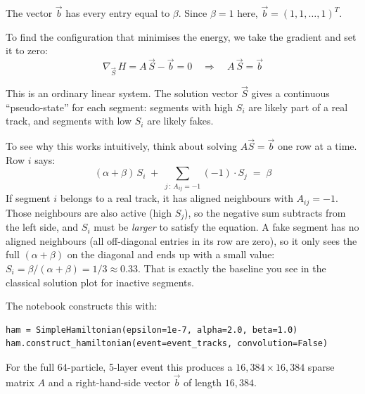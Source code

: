 \documentclass[11pt, a4paper]{article}
\begin{document}
The vector $\vec{b}$ has every entry equal to $\beta$. Since $\beta = 1$
here, $\vec{b} = (1, 1, \ldots, 1)^T$.

To find the configuration that minimises the energy, we take the gradient
and set it to zero:
\begin{equation}
    \nabla_{\vec{S}}\, H = A\,\vec{S} - \vec{b} = 0
    \quad\Longrightarrow\quad
    A\,\vec{S} = \vec{b}
\end{equation}

This is an ordinary linear system. The solution vector $\vec{S}$ gives a
continuous ``pseudo-state'' for each segment: segments with high $S_i$ are
likely part of a real track, and segments with low $S_i$ are likely fakes.

To see why this works intuitively, think about solving $A\vec{S} =
\vec{b}$ one row at a time. Row $i$ says:
\begin{equation}
    (\alpha + \beta)\,S_i \;+\; \sum_{j\,:\, A_{ij}=-1} (-1)\cdot S_j \;=\; \beta
\end{equation}
If segment $i$ belongs to a real track, it has aligned neighbours with
$A_{ij} = -1$. Those neighbours are also active (high $S_j$), so the
negative sum subtracts from the left side, and $S_i$ must be \emph{larger}
to satisfy the equation. A fake segment has no aligned neighbours
(all off-diagonal entries in its row are zero), so it only sees the full
$(\alpha + \beta)$ on the diagonal and ends up with a small value:
$S_i = \beta / (\alpha + \beta) = 1/3 \approx 0.33$. That is exactly the
baseline you see in the classical solution plot for inactive segments.

The notebook constructs this with:

\begin{lstlisting}[caption={Hamiltonian construction}]
ham = SimpleHamiltonian(epsilon=1e-7, alpha=2.0, beta=1.0)
ham.construct_hamiltonian(event=event_tracks, convolution=False)
\end{lstlisting}

For the full 64-particle, 5-layer event this produces a $16{,}384 \times
16{,}384$ sparse matrix $A$ and a right-hand-side vector $\vec{b}$ of
length $16{,}384$.
\end{document}

